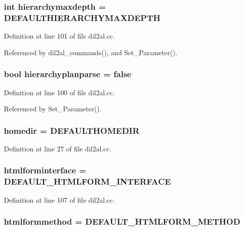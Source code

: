 \subsubsection{\setlength{\rightskip}{0pt plus 5cm}int hierarchymaxdepth = DEFAULTHIERARCHYMAXDEPTH}\label{dil2al_8cc_a75}




Definition at line 101 of file dil2al.cc.

Referenced by dil2al\_\-commands(), and Set\_\-Parameter().
\subsubsection{\setlength{\rightskip}{0pt plus 5cm}bool hierarchyplanparse = {\bf false}}\label{dil2al_8cc_a74}




Definition at line 100 of file dil2al.cc.

Referenced by Set\_\-Parameter().
\subsubsection{ homedir = DEFAULTHOMEDIR}\label{dil2al_8cc_a1}




Definition at line 27 of file dil2al.cc.
\subsubsection{ htmlforminterface = DEFAULT\_\-HTMLFORM\_\-INTERFACE}\label{dil2al_8cc_a81}




Definition at line 107 of file dil2al.cc.
\subsubsection{ htmlformmethod = DEFAULT\_\-HTMLFORM\_\-METHOD}\label{dil2al_8cc_a82}




